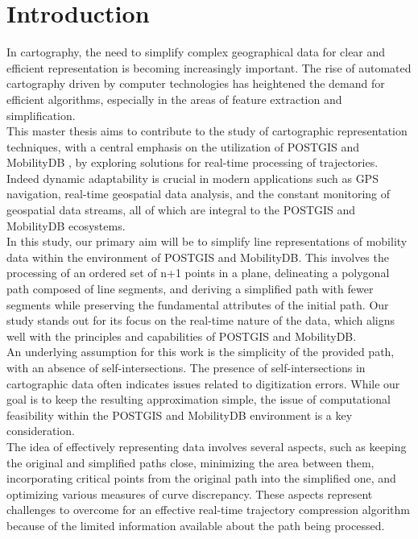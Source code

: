 
\chapter{Introduction}


In cartography, the need to simplify complex geographical data for clear and efficient representation is becoming increasingly important. The rise of automated cartography driven by computer technologies has heightened the demand for efficient algorithms, especially in the areas of feature extraction and simplification.\\


This master thesis aims to contribute to the study of cartographic representation techniques, with a central emphasis on the utilization of POSTGIS and MobilityDB \cite{zimanyi2019mobilitydb}, by exploring solutions for real-time processing of trajectories. Indeed dynamic adaptability is crucial in modern applications such as GPS navigation, real-time geospatial data analysis, and the constant monitoring of geospatial data streams, all of which are integral to the POSTGIS and MobilityDB ecosystems.\\



In this study, our primary aim will be to simplify line representations of mobility data within the environment of POSTGIS and MobilityDB. This involves the processing of an ordered set of n+1 points in a plane, delineating a polygonal path composed of line segments, and deriving a simplified path with fewer segments while preserving the fundamental attributes of the initial path. Our study stands out for its focus on the real-time nature of the data, which aligns well with the principles and capabilities of POSTGIS and MobilityDB.\\




An underlying assumption for this work is the simplicity of the provided path, with an absence of self-intersections. The presence of self-intersections in cartographic data often indicates issues related to digitization errors. While our goal is to keep the resulting approximation simple, the issue of computational feasibility within the POSTGIS and MobilityDB environment is a key consideration.\\




The idea of effectively representing data involves several aspects, such as keeping the original and simplified paths close, minimizing the area between them, incorporating critical points from the original path into the simplified one, and optimizing various measures of curve discrepancy. These aspects represent challenges to overcome for an effective real-time trajectory compression algorithm because of the limited information available about the path being processed.\\



